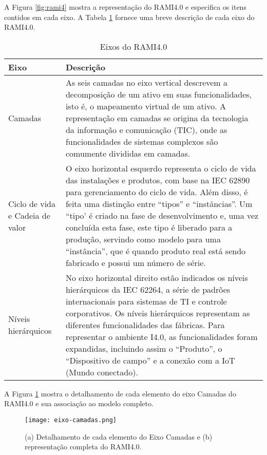 	A Figura \ref{fig:rami4} mostra a representação do RAMI4.0 e especifica os itens contidos em cada eixo. A Tabela \ref{tab:rami-eixos} fornece uma breve descrição de cada eixo do RAMI4.0.
	
	\begin{table}[hbt!]
		\centering
		\caption{Eixos do RAMI4.0}
		\begin{tabular}{|p{1.3in}|p{4in}|}
			
			\hline
			\textbf{Eixo}
			&\textbf{Descrição} \\
			
			\hline
			Camadas
			& As seis camadas no eixo vertical descrevem a decomposição de um ativo em suas funcionalidades, isto é, o mapeamento virtual de um ativo. A representação em camadas se origina da tecnologia da informação e comunicação (TIC), onde as funcionalidades de sistemas complexos são comumente divididas em camadas. \\
			
			
			\hline
			Ciclo de vida e  Cadeia de valor
			& O eixo horizontal esquerdo representa o ciclo de vida das instalações e produtos, com base na IEC 62890 para gerenciamento do ciclo de vida. Além disso, é feita uma distinção entre ``tipos'' e ``instâncias''. Um ``tipo' é criado na fase de desenvolvimento e, uma vez concluída esta fase, este tipo é liberado para a produção, servindo como modelo para uma ``instância'', que é quando produto real está sendo fabricado e possui um número de série. \\
			
			\hline
			Níveis hierárquicos
			& No eixo horizontal direito estão indicados os níveis hierárquicos da IEC 62264, a série de padrões internacionais para sistemas de TI e controle corporativos. Os níveis hierárquicos representam as diferentes funcionalidades das fábricas. Para representar o ambiente I4.0, as funcionalidades foram expandidas, incluindo assim o ``Produto'', o ``Dispositivo de campo'' e a conexão com a IoT (Mundo conectado). \\
			\hline
			
		\end{tabular}
		\label{tab:rami-eixos}
	\end{table}

	A Figura \ref{fig:eixo-camadas} mostra o detalhamento de cada elemento do eixo Camadas do RAMI4.0 e sua associação ao modelo completo.
	
	\begin{figure}[hbt!]
		\centering
		\caption{(a) Detalhamento de cada elemento do Eixo Camadas e (b) representação completa do RAMI4.0.}
		\texttt{[image: eixo-camadas.png]}
		\label{fig:eixo-camadas}
	\end{figure}

